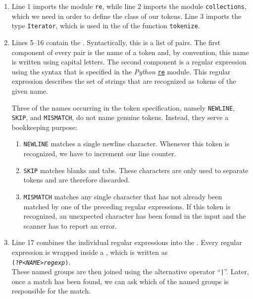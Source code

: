 \begin{enumerate}
\item Line 1 imports the module \texttt{re}, while line 2 imports the module \texttt{collections}, which we
      need in order to define the class of our tokens.  Line 3 imports the type \texttt{Iterator}, which is
      used in the  of the function \texttt{tokenize}.
\item Lines 5--16 contain the .  Syntactically, this is a
      list of pairs.  The first component of every pair is the name of a token and, by convention, this name is
      written using capital letters.  The second component is a regular expression using the syntax that is
      specified in the \textsl{Python} \href{https://docs.python.org/3/library/re.html}{\texttt{re}} module.
      This regular expression describes the set of strings that are recognized as tokens of the given name.

      Three of the names occurring in the token specification, namely \texttt{NEWLINE}, \texttt{SKIP}, and
      \texttt{MISMATCH}, do not name genuine tokens.  Instead, they serve a bookkeeping purpose:
      \begin{enumerate}
      \item \texttt{NEWLINE} matches a single newline character.  Whenever this token is recognized, we have to
            increment our line counter.
      \item \texttt{SKIP} matches blanks and tabs.  These characters are only used to separate tokens and are
            therefore discarded.
      \item \texttt{MISMATCH} matches any single character that has not already been matched by one of the
            preceding regular expressions.  If this token is recognized, an unexpected character has been found
            in the input and the scanner has to report an error.
      \end{enumerate}
\item Line 17 combines the individual regular expressions into the .  Every regular
      expression is wrapped inside a , which is written as
      \\[0.2cm]
      \hspace*{1.3cm}
      \texttt{(?P<\textsl{NAME}>\textsl{regexp})}.
      \\[0.2cm]
      These named groups are then joined using the alternative operator ``\texttt{|}''.  Later, once a match has
      been found, we can ask which of the named groups is responsible for the match.


\end{enumerate}
